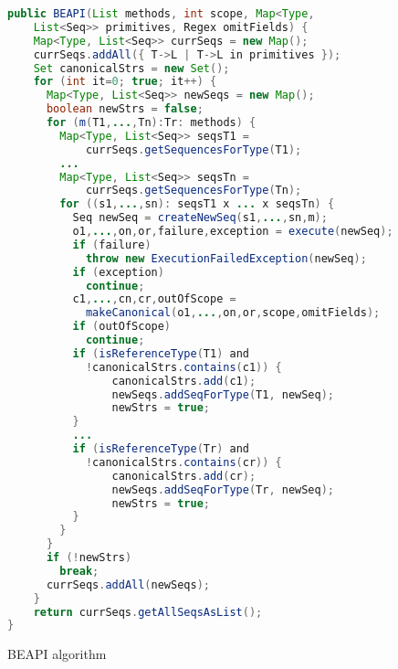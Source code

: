 \begin{figure}[t!]

\begin{lstlisting}[language=Java]
public BEAPI(List methods, int scope, Map<Type, 
    List<Seq>> primitives, Regex omitFields) {
    Map<Type, List<Seq>> currSeqs = new Map();
    currSeqs.addAll({ T->L | T->L in primitives });
    Set canonicalStrs = new Set();
    for (int it=0; true; it++) {
      Map<Type, List<Seq>> newSeqs = new Map();
      boolean newStrs = false;
      for (m(T1,...,Tn):Tr: methods) {
        Map<Type, List<Seq>> seqsT1 = 
            currSeqs.getSequencesForType(T1);
        ...
        Map<Type, List<Seq>> seqsTn = 
            currSeqs.getSequencesForType(Tn);
        for ((s1,...,sn): seqsT1 x ... x seqsTn) {
          Seq newSeq = createNewSeq(s1,...,sn,m);
          o1,...,on,or,failure,exception = execute(newSeq);
          if (failure) 
            throw new ExecutionFailedException(newSeq);
          if (exception) 
            continue;
          c1,...,cn,cr,outOfScope = 
            makeCanonical(o1,...,on,or,scope,omitFields);
          if (outOfScope) 
            continue;
          if (isReferenceType(T1) and 
            !canonicalStrs.contains(c1)) {
                canonicalStrs.add(c1);
                newSeqs.addSeqForType(T1, newSeq);
                newStrs = true;
          }
          ...
          if (isReferenceType(Tr) and 
            !canonicalStrs.contains(cr)) {
                canonicalStrs.add(cr);
                newSeqs.addSeqForType(Tr, newSeq);
                newStrs = true;
          }
        }
      }
      if (!newStrs) 
        break;
      currSeqs.addAll(newSeqs);
    }
    return currSeqs.getAllSeqsAsList();
}
\end{lstlisting}
\caption{\textsf{BEAPI} algorithm}
\label{alg:beapi}
\end{figure}

